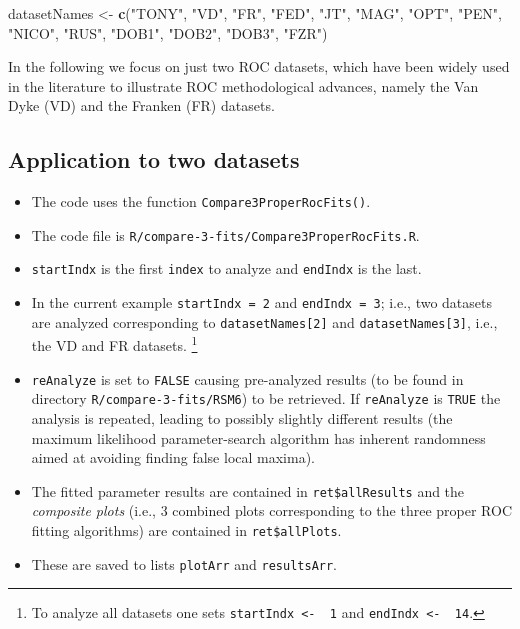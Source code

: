 \documentclass[
]{book}
\newenvironment{Shaded}{\begin{snugshade}}{\end{snugshade}}
\newcommand{\KeywordTok}[1]{\textcolor[rgb]{0.13,0.29,0.53}{\textbf{#1}}}
\newcommand{\NormalTok}[1]{#1}
\newcommand{\StringTok}[1]{\textcolor[rgb]{0.31,0.60,0.02}{#1}}
\providecommand{\tightlist}{%
  \setlength{\itemsep}{0pt}\setlength{\parskip}{0pt}}
\begin{document}
\begin{Shaded}
\begin{Highlighting}[]
\NormalTok{datasetNames <-}\StringTok{  }\KeywordTok{c}\NormalTok{(}\StringTok{"TONY"}\NormalTok{, }\StringTok{"VD"}\NormalTok{, }\StringTok{"FR"}\NormalTok{, }
            \StringTok{"FED"}\NormalTok{, }\StringTok{"JT"}\NormalTok{, }\StringTok{"MAG"}\NormalTok{, }
            \StringTok{"OPT"}\NormalTok{, }\StringTok{"PEN"}\NormalTok{, }\StringTok{"NICO"}\NormalTok{,}
            \StringTok{"RUS"}\NormalTok{, }\StringTok{"DOB1"}\NormalTok{, }\StringTok{"DOB2"}\NormalTok{, }
            \StringTok{"DOB3"}\NormalTok{, }\StringTok{"FZR"}\NormalTok{)}
\end{Highlighting}
\end{Shaded}

In the following we focus on just two ROC datasets, which have been widely used in the literature to illustrate ROC methodological advances, namely the Van Dyke (VD) and the Franken (FR) datasets.

\hypertarget{rsm-3-fits-two-datasets}{%
\subsection{Application to two datasets}\label{rsm-3-fits-two-datasets}}

\begin{itemize}
\tightlist
\item
  The code uses the function \texttt{Compare3ProperRocFits()}.
\item
  The code file is \texttt{R/compare-3-fits/Compare3ProperRocFits.R}.
\item
  \texttt{startIndx} is the first \texttt{index} to analyze and \texttt{endIndx} is the last.
\item
  In the current example \texttt{startIndx\ =\ 2} and \texttt{endIndx\ =\ 3}; i.e., two datasets are analyzed corresponding to \texttt{datasetNames{[}2{]}} and \texttt{datasetNames{[}3{]}}, i.e., the VD and FR datasets. \footnote{To analyze all datasets one sets \texttt{startIndx\ \textless{}-\ \ 1} and \texttt{endIndx\ \textless{}-\ \ 14}.}
\item
  \texttt{reAnalyze} is set to \texttt{FALSE} causing pre-analyzed results (to be found in directory \texttt{R/compare-3-fits/RSM6}) to be retrieved. If \texttt{reAnalyze} is \texttt{TRUE} the analysis is repeated, leading to possibly slightly different results (the maximum likelihood parameter-search algorithm has inherent randomness aimed at avoiding finding false local maxima).
\item
  The fitted parameter results are contained in \texttt{ret\$allResults} and the \emph{composite plots} (i.e., 3 combined plots corresponding to the three proper ROC fitting algorithms) are contained in \texttt{ret\$allPlots}.
\item
  These are saved to lists \texttt{plotArr} and \texttt{resultsArr}.
\end{itemize}
\end{document}
